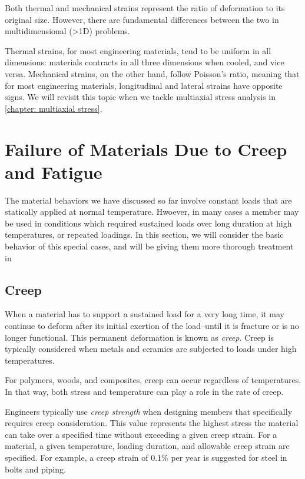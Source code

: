 \documentclass[
fontsize=10pt,
a4paper,
twosides=false,
open=any,
svgnames,
]{kaobook} %
\begin{document}
Both thermal and mechanical strains represent the ratio of deformation to its original size. However, there are fundamental differences between the two in multidimensional (>1D) problems.

Thermal strains, for most engineering materials, tend to be uniform in all dimensions: materials contracts in all three dimensions when cooled, and vice versa. Mechanical strains, on the other hand, follow Poisson's ratio, meaning that for most engineering materials, longitudinal and lateral strains have opposite signs. We will revisit this topic when we tackle multiaxial stress analysis in \cref{chapter: multiaxial stress}.

\section{Failure of Materials Due to Creep and Fatigue}

The material behaviors we have discussed so far involve constant loads that are statically applied at normal temperature. Hwoever, in many cases a member may be used in conditions which required sustained loads over long duration at high temperatures, or repeated loadings. In this section, we will consider the basic behavior of this special cases, and will be giving them more thorough treatment in 

\subsection{Creep}

When a material has to support a sustained load for a very long time, it may continue to deform after its initial exertion of the load--until it is fracture or is no longer functional. This permanent deformation is known as \emph{creep}. Creep is typically considered when metals and ceramics are subjected to loads under high temperatures.

For polymers, woods, and composites, creep can occur regardless of temperatures. In that way, both stress and temperature can play a role in the rate of creep.

Engineers typically use \emph{creep strength} when designing members that specifically requires creep consideration. This value represents the highest stress the material can take over a specified time without exceeding a given creep strain. For a material, a given temperature, loading duration, and allowable creep strain are specified. For example, a creep strain of 0.1\% per year is suggested for steel in bolts and piping. \cite{hibbeler2013}
\end{document}
